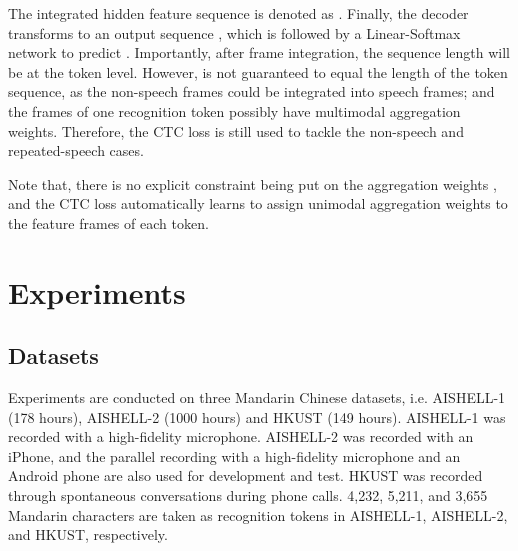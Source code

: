 \documentclass{article}
\begin{document}
The integrated hidden feature sequence is denoted as . Finally, the decoder transforms  to an output sequence , which is followed by a Linear-Softmax network to predict . Importantly, after frame integration, the sequence length  will be at the token level. However,  is not guaranteed to equal the length of the token sequence, as the non-speech frames could be integrated into speech frames; and the frames of one recognition token possibly have multimodal aggregation weights. Therefore, the CTC loss is still used to tackle the non-speech and repeated-speech cases. 

Note that, there is no explicit constraint being put on the aggregation weights , and the CTC loss automatically learns to assign unimodal aggregation weights to the feature frames of each token. 










 \section{Experiments}
\label{sec:experiments}

\subsection{Datasets}
Experiments are conducted on three Mandarin Chinese datasets, i.e. AISHELL-1 \cite{bu2017aishell} (178 hours), AISHELL-2 \cite{du2018aishell} (1000 hours) and HKUST \cite{liu2006hkust} (149 hours). AISHELL-1 was recorded with a high-fidelity microphone. AISHELL-2 was recorded with an iPhone, and the parallel recording with a high-fidelity microphone and an Android phone are also used for development and test. HKUST was recorded through spontaneous conversations during phone calls. 4,232, 5,211, and 3,655 Mandarin characters are taken as recognition tokens in AISHELL-1, AISHELL-2, and HKUST, respectively. 
\end{document}

